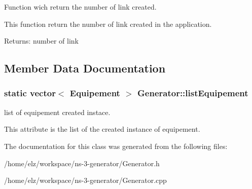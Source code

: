 Function wich return the number of link created. 

This function return the number of link created in the application.

\begin{Desc}
\item[Returns:]number of link \end{Desc}


\subsection{Member Data Documentation}
\hypertarget{class_generator_0dd96c3c4305399cefa743714a889972}{
\subsubsection[{listEquipement}]{\setlength{\rightskip}{0pt plus 5cm}static vector$<$ {\bf Equipement} $>$ {\bf Generator::listEquipement}}}
\label{class_generator_0dd96c3c4305399cefa743714a889972}


list of equipement created instace. 

This attribute is the list of the created instance of equipement. 

The documentation for this class was generated from the following files:\begin{CompactItemize}
\item 
/home/elz/workspace/ns-3-generator/Generator.h\item 
/home/elz/workspace/ns-3-generator/Generator.cpp\end{CompactItemize}
